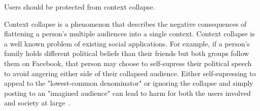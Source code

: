 






\begin{requirement}
\label{requirements:context-differentiation}
    Users should be protected from context collapse.
\end{requirement}

Context collapse is a phenomenon that describes the negative consequences of flattening
a person's multiple audiences into a single context.
Context collapse is a well known problem of existing social applications.
For example, if a person's family holds different political beliefs than their friends
but both groups follow them on Facebook, that person may choose to self-supress their political
speech to avoid angering either side of their collapsed audience.
Either self-supressing to appeal to the "lowest-common denominator" or ignoring the collapse
and simply posting to an "imagined audience" can lead to harm for both
the users involved and society at large~\cite{contextcollapse, contextcollapseimpact, contextcollapsequeer, spiralofsilencesocialmedia}.


